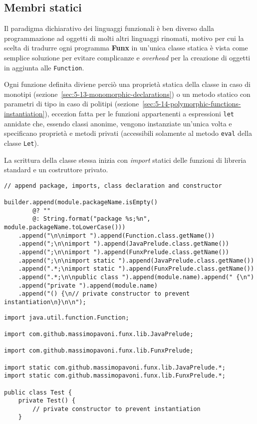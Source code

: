 \subsection{Membri statici}
\label{sec:5-11-static-members}

Il paradigma dichiarativo dei linguaggi funzionali è ben diverso dalla programmazione ad oggetti di molti altri linguaggi rinomati,
motivo per cui la scelta di tradurre ogni programma \textbf{Funx} in un'unica classe statica è vista come semplice soluzione
per evitare complicanze e \textit{overhead} per la creazione di oggetti in aggiunta alle \texttt{Function}.


Ogni funzione definita diviene perciò una proprietà statica della classe in caso di monotipi (sezione~\ref{sec:5-13-monomorphic-declarations})
o un metodo statico con parametri di tipo in caso di politipi (sezione~\ref{sec:5-14-polymorphic-functions-instantiation}),
eccezion fatta per le funzioni appartenenti a espressioni \texttt{let} annidate che, essendo classi anonime, vengono instanziate
un'unica volta e specificano proprietà e metodi privati (accessibili solamente al metodo \texttt{eval} della classe \texttt{Let}).

\noindent La scrittura della classe stessa inizia con \textit{import} statici delle funzioni di libreria standard e un costruttore privato.

\vspace{4mm}
\begin{lstlisting}[caption={Prime aggiunte alla stringa \texttt{Java}}, style=javaCode, label={lst:5-11-first-append-java}]
// append package, imports, class declaration and constructor

builder.append(module.packageName.isEmpty()
        @? ""
        @: String.format("package %s;%n", module.packageName.toLowerCase()))
    .append("\n\nimport ").append(Function.class.getName())
    .append(";\n\nimport ").append(JavaPrelude.class.getName())
    .append(";\n\nimport ").append(FunxPrelude.class.getName())
    .append(";\n\nimport static ").append(JavaPrelude.class.getName())
    .append(".*;\nimport static ").append(FunxPrelude.class.getName())
    .append(".*;\n\npublic class ").append(module.name).append(" {\n")
    .append("private ").append(module.name)
    .append("() {\n// private constructor to prevent instantiation\n}\n\n");
\end{lstlisting}
\vspace{4mm}
\begin{lstlisting}[caption={Corrispondente codice \texttt{Java} generato}, style=javaCode, label={lst:5-11-class-start-java}]
import java.util.function.Function;

import com.github.massimopavoni.funx.lib.JavaPrelude;

import com.github.massimopavoni.funx.lib.FunxPrelude;

import static com.github.massimopavoni.funx.lib.JavaPrelude.*;
import static com.github.massimopavoni.funx.lib.FunxPrelude.*;

public class Test {
    private Test() {
        // private constructor to prevent instantiation
    }    
\end{lstlisting}